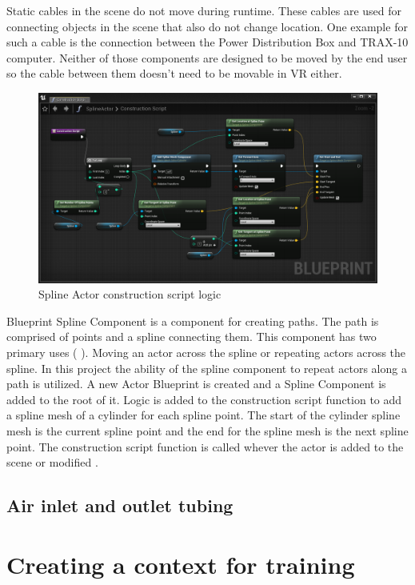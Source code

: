 \documentclass[12pt, a4paper,oneside, nocenter]{thesis}
\newcommand{\citeyeartitlexamkinline}[1]{(\usebibentry{#1}{title} \citeyear{#1})}
\begin{document}
\par
Static cables in the scene do not move during runtime. These cables are used for connecting objects in the scene that also do not change location. One example for such a cable is the connection between the Power Distribution Box and TRAX-10 computer. Neither of those components are designed to be moved by the end user so the cable between them doesn't need to be movable in VR either.
\begin{figure}[H]
	\includegraphics[width=\textwidth]{spline-component}
	\caption{Spline Actor construction script logic}
	\label{fig:spline-component}
\end{figure}
\par
Blueprint Spline Component is a component for creating paths. The path is comprised of points and a spline connecting them. This component has two primary uses \citeyeartitlexamkinline{spline-component}. Moving an actor across the spline or repeating actors across the spline. In this project the ability of the spline component to repeat actors along a path is utilized. A new Actor Blueprint is created and a Spline Component is added to the root of it. Logic is added to the construction script function to add a spline mesh of a cylinder for each spline point. The start of the cylinder spline mesh is the current spline point and the end for the spline mesh is the next spline point. The construction script function is called whever the actor is added to the scene or modified . 
\subsection{Air inlet and outlet tubing}
\section{Creating a context for training}
\end{document}
